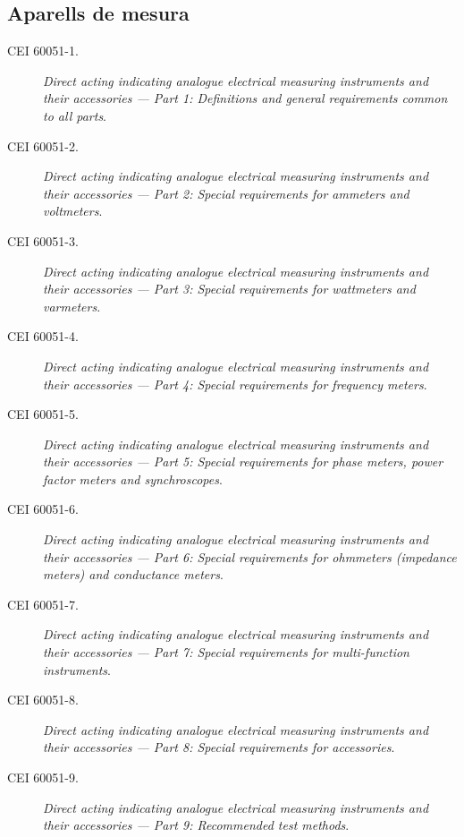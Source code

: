 \subsection*{Aparells de mesura}
\begin{description}
	\item [\hspace{5mm}CEI 60051-1.] \textit{Direct acting indicating analogue electrical measuring instruments and their accessories --- Part 1:  Definitions and general requirements common to all parts}.
	\item [\hspace{5mm}CEI 60051-2.] \textit{Direct acting indicating analogue electrical measuring instruments and their accessories --- Part 2:  Special requirements for ammeters and voltmeters}.
	\item [\hspace{5mm}CEI 60051-3.] \textit{Direct acting indicating analogue electrical measuring instruments and their accessories --- Part 3: Special requirements for wattmeters and varmeters}.
	\item [\hspace{5mm}CEI 60051-4.] \textit{Direct acting indicating analogue electrical measuring instruments and their accessories  --- Part 4:  Special requirements for frequency meters}.
	\item [\hspace{5mm}CEI 60051-5.] \textit{Direct acting indicating analogue electrical measuring instruments and their accessories --- Part 5:  Special requirements for phase meters, power factor meters and synchroscopes}.
	\item [\hspace{5mm}CEI 60051-6.] \textit{Direct acting indicating analogue electrical measuring instruments and their accessories --- Part 6:  Special requirements for ohmmeters (impedance meters) and conductance meters}.
	\item [\hspace{5mm}CEI 60051-7.] \textit{Direct acting indicating analogue electrical measuring instruments and their accessories --- Part 7:  Special requirements for multi-function instruments}.
	\item [\hspace{5mm}CEI 60051-8.] \textit{Direct acting indicating analogue electrical measuring instruments and their accessories --- Part 8:  Special requirements for accessories}.
	\item [\hspace{5mm}CEI 60051-9.] \textit{Direct acting indicating analogue electrical measuring instruments and their accessories --- Part 9:  Recommended test methods}.
\end{description}


